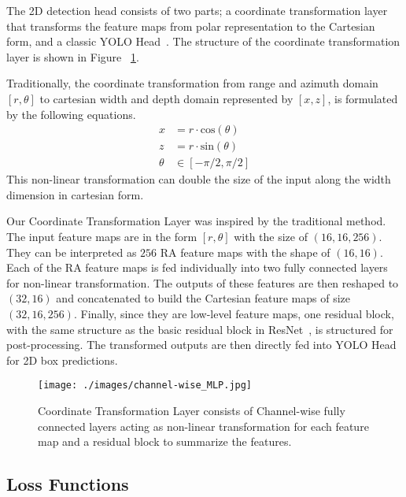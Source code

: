 \documentclass[10pt, conference, compsocconf]{IEEEtran}
\begin{document}
The 2D detection head consists of two parts; a coordinate transformation layer that transforms the feature maps from polar representation to the Cartesian form, and a classic YOLO Head~\cite{Ref:YOLOv4}. The structure of the coordinate transformation layer is shown in Figure ~\ref{F:CoordinateTransformation}.

Traditionally, the coordinate transformation from range and azimuth domain $[r, \theta]$ to cartesian width and depth domain represented by $[x, z]$, is formulated by the following equations.
\begin{equation}
\begin{split}
	x &= r \cdot \text{cos}(\theta) \\
	z &= r \cdot \text{sin}(\theta) \\
	\theta &\in [-\pi/2, \pi/2]
\end{split}
\label{eq:Pol2Cart}
\end{equation}
This non-linear transformation can double the size of the input along the width dimension in cartesian form. %

Our Coordinate Transformation Layer was inspired by the traditional method. The input feature maps are in the form $[r, \theta]$ with the size of $(16, 16, 256)$. They can be interpreted as $256$ RA feature maps with the shape of $(16, 16)$. Each of the RA feature maps is fed individually into two fully connected layers for non-linear transformation. The outputs of these features are then reshaped to $(32, 16)$ and concatenated to build the Cartesian feature maps of size $(32, 16, 256)$. Finally, since they are low-level feature maps, one residual block, with the same structure as the basic residual block in ResNet~\cite{BG:ResNet}, is structured for post-processing. The transformed outputs are then directly fed into YOLO Head for 2D box predictions.

\begin{figure}[!t]
	\centering
	\texttt{[image: ./images/channel-wise\_MLP.jpg]}
	\caption{Coordinate Transformation Layer consists of Channel-wise fully connected layers acting as non-linear transformation for each feature map and a residual block to summarize the features.}
	\label{F:CoordinateTransformation}
\end{figure}

\subsection{Loss Functions}
\end{document}
